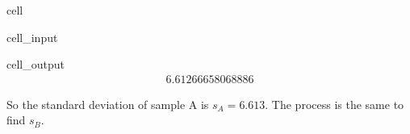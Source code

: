 \documentclass[letterpaper,10pt,english]{jupyterBook}
\begin{document}
\begin{sphinxuseclass}{cell}\begin{sphinxVerbatimInput}

\begin{sphinxuseclass}{cell_input}
\begin{sphinxVerbatim}[commandchars=\\\{\}]


\end{sphinxVerbatim}

\end{sphinxuseclass}\end{sphinxVerbatimInput}
\begin{sphinxVerbatimOutput}

\begin{sphinxuseclass}{cell_output}\begin{equation*}
\begin{split}6.61266658068886\end{split}
\end{equation*}
\end{sphinxuseclass}\end{sphinxVerbatimOutput}

\end{sphinxuseclass}
\sphinxAtStartPar
So the standard deviation of sample A is \(s_A = 6.613\). The process is the same to find \(s_B\).
\end{document}
